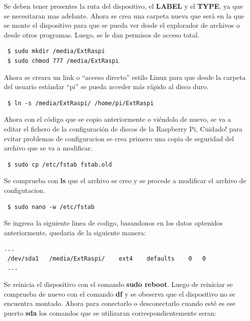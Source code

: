 \documentclass{article}
\begin{document}
Se deben tener presentes la ruta del dispositivo, el \textbf{LABEL} y el \textbf{TYPE}, ya que se necesitaran mas adelante. Ahora se crea una carpeta nueva que será en la que se monte el dispositivo para que se pueda ver desde el explorador de archivos o desde otros programas. Luego, se le dan  permisos de acceso total.

\begin{verbatim}
 $ sudo mkdir /media/ExtRaspi
 $ sudo chmod 777 /media/ExtRaspi

\end{verbatim}

Ahora se creara un link o “acceso directo” estilo Linux para que desde la carpeta del usuario estándar “pi” se pueda acceder más rápido al disco duro.

\begin{verbatim}
 $ ln -s /media/ExtRaspi/ /home/pi/ExtRaspi

\end{verbatim}

Ahora con el código que se copio anteriormente o viéndolo de nuevo, se va a editar el fichero de la configuración de discos de la Raspberry Pi, Cuidado! para evitar problemas de configuracion se crea primero una copia de seguridad del archivo que se va a modificar.

\begin{verbatim}
 $ sudo cp /etc/fstab fstab.old

\end{verbatim}

Se comprueba con \textbf{ls} que el archivo se creo y se procede a modificar el archivo de configutacion.

\begin{verbatim}
 $ sudo nano -w /etc/fstab

\end{verbatim}

Se ingresa la siguiente linea de codigo, basandonos en los datos optenidos anteriormente, quedaria de la siguiente manera:

\begin{lstlisting}[frame=single, framesep=7pt]
 ...
 /dev/sda1   /media/ExtRaspi/    ext4    defaults    0   0
 ...
\end{lstlisting}

Se reinicia el dispositivo con el comando \textbf{sudo reboot}. Luego de reiniciar se comprueba de nuevo con el comando \textbf{df} y se obeserva que el dispositivo no se encuentra montado. Ahora para conectarlo o desconectarlo cuando esté es ese puerto \textbf{sda} los comandos que se utilizaran correspondientemente seran:
\end{document}
